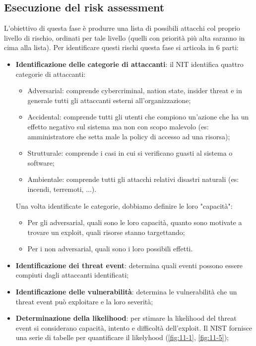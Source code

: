 \subsection{Esecuzione del risk assessment}
L'obiettivo di questa fase è produrre una lista di possibili attacchi col proprio livello di rischio, ordinati per tale livello (quelli con priorità più alta saranno in cima alla lista). Per identificare questi rischi questa fase si articola in 6 parti:
\begin{itemize}
    \item \textbf{Identificazione delle categorie di attaccanti}: il NIT identifica quattro categorie di attaccanti:
    \begin{itemize}
        \item Adversarial: comprende cybercriminal, nation state, insider threat e in generale tutti gli attaccanti esterni all'organizzazione;
        \item Accidental: comprende tutti gli utenti che compiono un'azione che ha un effetto negativo sul sistema ma non con scopo malevolo (es: amministratore che setta male la policy di accesso ad una risorsa);
        \item Strutturale: comprende i casi in cui si verificano guasti al sistema o software;
        \item Ambientale: comprende tutti gli attacchi relativi  disastri naturali (es: incendi, terremoti, ...).
    \end{itemize}

    \noindent Una volta identificate le categorie, dobbiamo definire le loro "capacità":
    \begin{itemize}
        \item Per gli adversarial, quali sono le loro capacità, quanto sono motivate a trovare un exploit, quali risorse stanno targettando;
        \item Per i non adversarial, quali sono i loro possibili effetti.
    \end{itemize}

    \item \textbf{Identificazione dei threat event}: determina quali eventi possono essere compiuti dagli attaccanti identificati;

    \item \textbf{Identificazione delle vulnerabilità}: determina le vulnerabilità che un threat event può exploitare e la loro severità;

    \item \textbf{Determinazione della likelihood}: per stimare la likelihood del threat event si considerano capacità, intento e difficoltà dell'exploit. Il NIST fornisce una serie di tabelle per quantificare il likelyhood (\ref{fig:11-1}, \ref{fig:11-5});


\end{itemize}
